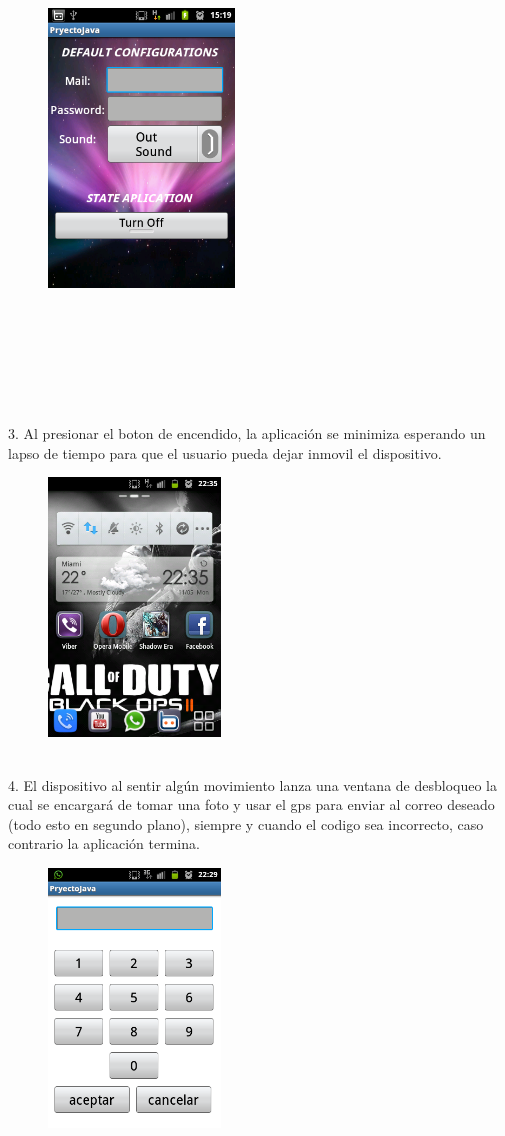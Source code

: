 \documentclass[12pt,letterpaper]{article}
\begin{document}
\begin{figure}[h]
\begin{center}
\includegraphics[width=140pt]{max2.png}\\
\end{center}
\end{figure}\\\\\\\\\\\\
3. Al presionar el boton de encendido, la aplicación se minimiza esperando un lapso de tiempo para que el usuario pueda dejar inmovil el dispositivo.
\begin{figure}[h]
\begin{center}
\includegraphics[width=130pt]{max4.png}\\
\end{center}
\end{figure}\\
4. El dispositivo al sentir algún movimiento lanza una ventana de desbloqueo la cual se encargará de tomar una foto y usar el gps para enviar al correo deseado (todo esto en segundo plano), siempre y cuando el codigo sea incorrecto, caso contrario la aplicación termina.
\begin{figure}[h]
\begin{center}
\includegraphics[width=130pt]{max3.png}\\
\end{center}
\end{figure}
\end{document}

